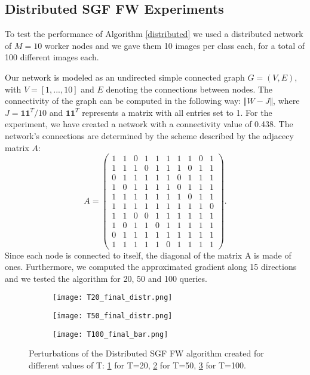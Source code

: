 \subsection{Distributed SGF FW Experiments}
To test the performance of Algorithm \ref{distributed} we used a distributed network of $M=10$ worker nodes and we
gave them 10 images per class each, for a total of 100 different images each.

Our network is modeled as an undirected simple connected graph $G = (V,E)$, with $V = [1,...,10]$ and $E$ denoting
the connections between nodes. The connectivity of the graph can be computed in the following way: $\Vert W- J \Vert$,
where $J= \mathbf{11}^T/10$ and $\mathbf{11}^T$ represents a matrix with all entries set to 1. For the experiment, we have created a network
with a connectivity value of 0.438. The network's connections are determined by the scheme described by the adjacecy
matrix $A$:
\[ A =
\begin{pmatrix}
1& 1& 0& 1& 1& 1& 1& 1& 0& 1\\
1& 1& 1& 0& 1& 1& 1& 0& 1& 1\\
0& 1& 1& 1& 1& 1& 0& 1& 1& 1\\
1& 0& 1& 1& 1& 1& 0& 1& 1& 1\\
1& 1& 1& 1& 1& 1& 1& 0& 1& 1\\
1& 1& 1& 1& 1& 1& 1& 1& 1& 0\\
1& 1& 0& 0& 1& 1& 1& 1& 1& 1\\
1& 0& 1& 1& 0& 1& 1& 1& 1& 1\\
0& 1& 1& 1& 1& 1& 1& 1& 1& 1\\
1& 1& 1& 1& 1& 0& 1& 1& 1& 1
\end{pmatrix}
.\]
Since each node is connected to itself, the diagonal of the matrix A is made of ones.
 Furthermore, we computed the approximated gradient along 15 directions and we tested
the algorithm for 20, 50 and 100 queries.

\begin{figure}%
	\centering
	\begin{subfigure}[b]{0.15\textwidth}
		\centering
		\texttt{[image: T20\_final\_distr.png]}
		\caption{}
		\label{fig:distributed_perturbation_20}
	\end{subfigure}
	\hfill
	\begin{subfigure}[b]{0.15\textwidth}
		\texttt{[image: T50\_final\_distr.png]}
		\caption{}
		\label{fig:variance-distributed_perturbation_50}
	\end{subfigure}
	\hfill
	\begin{subfigure}[b]{0.15\textwidth}
		\texttt{[image: T100\_final\_bar.png]}
		\caption{}
		\label{fig:distributed_perturbation_100}
	\end{subfigure}
	\caption{Perturbations of the Distributed SGF FW algorithm created for different values of T:
	  \ref{fig:distributed_perturbation_20} for T=20, \ref{fig:variance-distributed_perturbation_50} for T=50, \ref{fig:distributed_perturbation_100} for T=100.}
	\label{fig:perturbations}
\end{figure}

